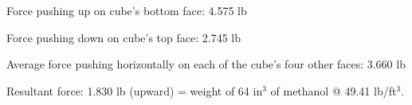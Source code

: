 
Force pushing up on cube's bottom face: 4.575 lb

Force pushing down on cube's top face: 2.745 lb

Average force pushing horizontally on each of the cube's four other faces: 3.660 lb

\vskip 10pt

Resultant force: 1.830 lb (upward) = weight of 64 in$^{3}$ of methanol @ 49.41 lb/ft$^{3}$.












